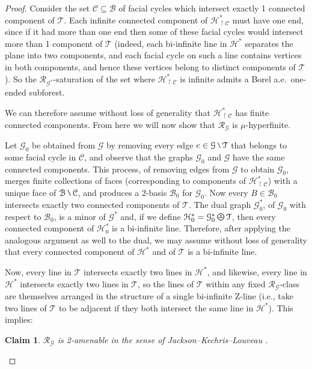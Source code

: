 \documentclass[11pt]{amsart}
\theoremstyle{definition}
\theoremstyle{plain}
\newtheorem*{claim}{Claim}
\newcommand{\<}{\langle}
\renewcommand{\>}{\rangle}
\newcommand{\mc}[1]{\mathcal{#1}}
\newcommand{\Z}{\bm{\mathrm{Z}}}
\newcommand{\Ggraph}{\mathcal{G}}
\newcommand{\Hgraph}{\mathcal{H}}
\newcommand{\Tgraph}{\mathcal{T}}
\newcommand\RR{\mathscr{R}}
\newcommand{\oPerpStar}{\begin{tikzpicture}[scale=0.134]
\draw[thick,line width=0.7pt](-0.6,-0.2)--(0.6,-0.2) ;
    \draw (0,0.1) node[scale=0.6] {\rm{*}};
  \draw[line width=0.7pt] (0,0) circle [radius=1];
\end{tikzpicture}}
\newcommand{\oPerpstar}{\mathbin{\raisebox{-1pt}{\oPerpStar}}}
\newcommand{\mysetminusD}{\hbox{\tikz{\draw[line width=0.6pt,line cap=round] (3pt,0) -- (0,6pt);}}}
\newcommand{\mysetminusT}{\mysetminusD}
\newcommand{\mysetminusS}{\hbox{\tikz{\draw[line width=0.45pt,line cap=round] (2pt,0) -- (0,4pt);}}}
\newcommand{\mysetminusSS}{\hbox{\tikz{\draw[line width=0.4pt,line cap=round] (1.5pt,0) -- (0,3pt);}}}
\newcommand{\mysetminus}{\mathbin{\mathchoice{\mysetminusD}{\mysetminusT}{\mysetminusS}{\mysetminusSS}}}%
\begin{document}
\begin{proof}
Consider the set $\mc{C}\subseteq \mc{B}$ of facial cycles which intersect exactly 1 connected component of ${\Tgraph}$. Each infinite connected component of ${\Hgraph}^*_{\restriction \mc{C}}$ must have one end, since if it had more than one end then some of these facial cycles would intersect more than 1 component of ${\Tgraph}$ (indeed, each bi-infinite line in $\Hgraph ^*$ separates the plane into two components, and each facial cycle on such a line contains vertices in both components, and hence these vertices belong to distinct components of $\Tgraph$). So the $\RR_{{\Ggraph}^*}$-saturation of the set where ${\Hgraph}^*_{\restriction \mc{C}}$ is infinite admits a Borel a.e.\ one-ended subforest.

We can therefore assume without loss of generality that ${\Hgraph}^*_{\restriction\mc{C}}$ has finite connected components. From here we will now show that $\RR_{\Ggraph}$ is $\mu$-hyperfinite.

Let $\Ggraph _0$ be obtained from $\Ggraph$ by removing every edge $e\in \Ggraph \mysetminus \Tgraph$ that belongs to some facial cycle in $\mc{C}$, and observe that the graphs $\Ggraph _0$ and $\Ggraph$ have the same connected components. This process, of removing edges from $\Ggraph$ to obtain $\Ggraph _0$, merges finite collections of faces (corresponding to components of $\Hgraph ^*_{\restriction \mc{C}}$) with a unique face of $\mc{B} \mysetminus \mc{C}$, and produces a $2$-basis $\mc{B} _0$ for $\Ggraph _0$. Now every $B\in \mc{B}_0$ intersects exactly two connected components of ${\Tgraph}$. The dual graph ${\Ggraph}_0^*$, of ${\Ggraph}_0$ with respect to $\mc{B}_0$, is a minor of ${\Ggraph}^*$ and, if we define ${\Hgraph}_0^* = {\Ggraph}_0^* \oPerpstar  \Tgraph$, then every connected component of ${\Hgraph}_0^*$ is a bi-infinite line. 
Therefore, after applying the analogous argument as well to the dual, we may assume without loss of generality that every connected component of ${\Hgraph}^*$ and of ${\Tgraph}$ is a bi-infinite line.

Now, every line in ${\Tgraph}$ intersects exactly two lines in ${\Hgraph}^*$, and likewise, every line in ${\Hgraph}^*$ intersects exactly two lines in ${\Tgraph}$, so the lines of ${\Tgraph}$ within any fixed $\RR_{\Ggraph}$-class are themselves arranged in the structure of a single bi-infinite $\Z$-line (i.e., take two lines of ${\Tgraph}$ to be adjacent if they both intersect the same line in $\Hgraph ^*$). 
This implies: 
\begin{claim}\label{claim:2-amen}
$\RR_{\Ggraph}$ is 2-amenable in the sense of Jackson--Kechris--Louveau \cite{JKL02}.
\end{claim}


\end{proof}
\end{document}
